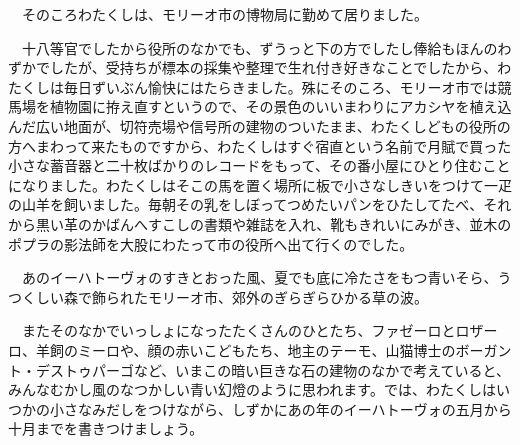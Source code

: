 \documentclass{mybook}
\begin{document}
　そのころわたくしは、モリーオ市の博物局に勤めて居りました。

　十八等官でしたから役所のなかでも、ずうっと下の方でしたし俸給もほんのわずかでしたが、受持ちが標本の採集や整理で生れ付き好きなことでしたから、わたくしは毎日ずいぶん愉快にはたらきました。殊にそのころ、モリーオ市では競馬場を植物園に拵え直すというので、その景色のいいまわりにアカシヤを植え込んだ広い地面が、切符売場や信号所の建物のついたまま、わたくしどもの役所の方へまわって来たものですから、わたくしはすぐ宿直という名前で月賦で買った小さな蓄音器と二十枚ばかりのレコードをもって、その番小屋にひとり住むことになりました。わたくしはそこの馬を置く場所に板で小さなしきいをつけて一疋の山羊を飼いました。毎朝その乳をしぼってつめたいパンをひたしてたべ、それから黒い革のかばんへすこしの書類や雑誌を入れ、靴もきれいにみがき、並木のポプラの影法師を大股にわたって市の役所へ出て行くのでした。

　あのイーハトーヴォのすきとおった風、夏でも底に冷たさをもつ青いそら、うつくしい森で飾られたモリーオ市、郊外のぎらぎらひかる草の波。

　またそのなかでいっしょになったたくさんのひとたち、ファゼーロとロザーロ、羊飼のミーロや、顔の赤いこどもたち、地主のテーモ、山猫博士のボーガント・デストゥパーゴなど、いまこの暗い巨きな石の建物のなかで考えていると、みんなむかし風のなつかしい青い幻燈のように思われます。では、わたくしはいつかの小さなみだしをつけながら、しずかにあの年のイーハトーヴォの五月から十月までを書きつけましょう。
\end{document}
